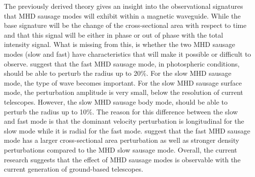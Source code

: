 	The previously derived theory \citep{Moreels2013,Moreels2013b,2015A&A...579A..73M,jess2015multiwavelength} gives an insight into the observational signatures that MHD sausage modes will exhibit within a magnetic waveguide.
	While the base signature will be the change of the cross-sectional area with respect to time and that this signal will be either in phase or out of phase with the total intensity signal. 
	What is missing from this, is whether the two MHD sausage modes (slow and fast) have characteristics that will make it possible or difficult to observe.
    \cite{Moreels2013} suggest that the fast MHD sausage mode, in photospheric conditions, should be able to perturb the radius up to 20\%.
    For the slow MHD sausage mode, the type of wave becomes important.
	For the slow MHD sausage surface mode, the perturbation amplitude is very small, below the resolution of current telescopes.
	However, the slow MHD sausage body mode, should be able to perturb the radius up to 10\%.
	The reason for this difference between the slow and fast mode is that the dominant velocity perturbation is longitudinal for the slow mode while it is radial for the fast mode.
    \cite{jess2015multiwavelength} suggest that the fast MHD sausage mode has a larger cross-sectional area perturbation as well as stronger density perturbations compared to the MHD slow sausage mode.
    Overall, the current research suggests that the effect of MHD sausage modes is observable with the current generation of ground-based telescopes.